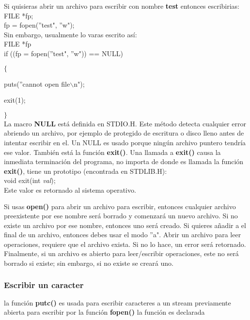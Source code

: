\documentclass[]{article}
\begin{document}
	Si quisieras abrir un archivo para escribir con nombre \textbf{test} entonces escribirias:\\
	
	FILE *fp;\\
	
	fp = fopen(''test", ''w");\\
	
	Sin embargo, usualmente lo varas escrito así:\\
	
	FILE *fp\\
	
	if ((fp = fopen(''test", ''w")) == NULL)
	
	$\lbrace$
	
	puts(''cannot open file$\backslash$n");
	
	exit(1);
	
	$\rbrace$\\
	
	La macro \textbf{NULL} está definida en STDIO.H. Este método detecta cualquier error abriendo un archivo, por ejemplo de protegido de escritura o disco lleno antes de intentar escribir en el. Un NULL es usado porque ningún archivo puntero tendría ese valor. También está la función \textbf{exit()}. Una llamada a \textbf{exit()} causa la inmediata terminación del programa, no importa de donde es llamada la función \textbf{exit()}, tiene un prototipo (encontrada en 	STDLIB.H):\\
	
	void exit(int \textit{val});\\
	
	Este valor es retornado al sistema operativo.
	
	Si usas \textbf{open()} para abrir un archivo para escribir, entonces cualquier archivo preexistente por ese nombre será borrado y comenzará un nuevo archivo. Si no existe un archivo por ese nombre, entonces uno será creado. Si quieres añadir a el final de un archivo, entonces debes usar el modo ''a". Abrir un archivo para leer operaciones, requiere que el archivo exista. Si no lo hace, un error será retornado. Finalmente, si un archivo es abierto para leer/escribir operaciones, este no será borrado si existe; sin embargo, si no existe se creará uno.
	
	\subsubsection{Escribir un caracter}
	
	la función \textbf{putc()} es usada para escribir caracteres a un stream previamente abierta para escribir por la función \textbf{fopen()} la función es declarada\\
	
\end{document}
